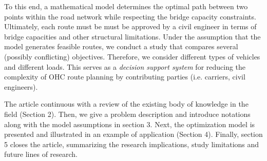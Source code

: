 To this end, a mathematical model determines the optimal path between two points within the road network while respecting the bridge capacity constraints.
Ultimately, each route must be must be approved by a civil engineer in terms of bridge capacities and other structural limitations. Under the assumption that the model generates feasible routes, we conduct a study that compares several (possibly conflicting) objectives.
Therefore, we consider different types of vehicles and different loads. This serves as a \textit{decision support system} for reducing the complexity of OHC route planning by contributing parties (i.e. carriers, civil engineers).
\par
The article continuous with a review of the existing body of knowledge in the field (Section 2).
Then, we give a problem description and introduce notations along with the model assumptions in section 3. Next, the optimization model is presented and illustrated in an example of application (Section 4).
Finally, section 5 closes the article, summarizing the research implications, study limitations and future lines of research.
